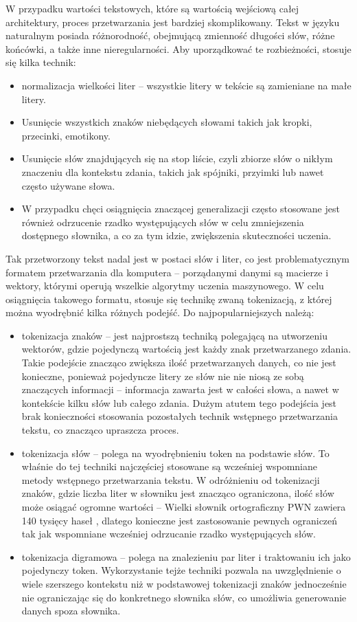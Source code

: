 W przypadku wartości tekstowych, które są wartością wejściową całej architektury, proces przetwarzania jest bardziej skomplikowany. Tekst w języku naturalnym posiada różnorodność, obejmującą zmienność długości słów, różne końcówki, a także inne nieregularności. Aby uporządkować te rozbieżności, stosuje się kilka technik:
\begin{itemize}
  \item normalizacja wielkości liter -- wszystkie litery w tekście są zamieniane na małe litery.
  \item Usunięcie wszystkich znaków niebędących słowami takich jak kropki, przecinki, emotikony.
  \item Usunięcie słów znajdujących się na stop liście, czyli zbiorze słów o nikłym znaczeniu dla kontekstu zdania, takich jak spójniki, przyimki lub nawet często używane słowa.
  \item W przypadku chęci osiągnięcia znaczącej generalizacji często stosowane jest również odrzucenie rzadko występujących słów w celu zmniejszenia dostępnego słownika, a co za tym idzie, zwiększenia skuteczności uczenia.
\end{itemize}
\noindent Tak przetworzony tekst nadal jest w postaci słów i liter, co jest problematycznym formatem przetwarzania dla komputera -- porządanymi danymi są macierze i wektory, którymi operują wszelkie algorytmy uczenia maszynowego. W celu osiągnięcia takowego formatu, stosuje się technikę zwaną tokenizacją, z której można wyodrębnić kilka różnych podejść. Do najpopularniejszych należą:
\begin{itemize}
  \item tokenizacja znaków -- jest najprostszą techniką polegającą na utworzeniu wektorów, gdzie pojedynczą wartością jest każdy znak przetwarzanego zdania. Takie podejście znacząco zwiększa ilość przetwarzanych danych, co nie jest konieczne, ponieważ pojedyncze litery ze słów nie nie niosą ze sobą znaczących informacji -- informacja zawarta jest w całości słowa, a nawet w kontekście kilku słów lub całego zdania. Dużym atutem tego podejścia jest brak konieczności stosowania pozostałych technik wstępnego przetwarzania tekstu, co znacząco upraszcza proces.
  \item tokenizacja słów -- polega na wyodrębnieniu token na podstawie słów. To właśnie do tej techniki najczęściej stosowane są wcześniej wspomniane metody wstępnego przetwarzania tekstu. W odróżnieniu od tokenizacji znaków, gdzie liczba liter w słowniku jest znacząco ograniczona, ilość słów może osiągać ogromne wartości -- Wielki słownik ortograficzny PWN zawiera 140 tysięcy haseł \cite{pwn2016}, dlatego konieczne jest zastosowanie pewnych ograniczeń tak jak wspomniane wcześniej odrzucanie rzadko występujących słów.
  \item tokenizacja digramowa -- polega na znalezieniu par liter i traktowaniu ich jako pojedynczy token. Wykorzystanie tejże techniki pozwala na uwzględnienie o wiele szerszego kontekstu niż w podstawowej tokenizacji znaków jednocześnie nie ograniczając się do konkretnego słownika słów, co umożliwia generowanie danych spoza słownika.
\end{itemize}
